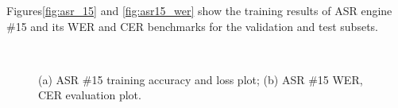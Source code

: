 Figures\;\ref{fig:asr_15} and \;\ref{fig:asr15_wer} show
the training results of ASR engine \#15 and its
WER and CER benchmarks for the validation and test subsets.
\begin{figure}[H]
    \centering
    \\
    \vspace{-0.3cm}
    \caption{(a) ASR \#15 training accuracy and loss plot;\;\;
        (b) ASR \#15 WER, CER evaluation plot.}\label{fig:asr15_wer_subplot} 
\end{figure}

